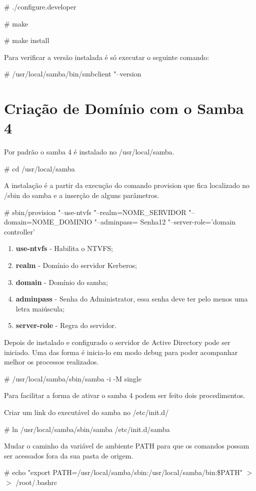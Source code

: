 \# ./configure.developer

\# make 

\# make install

Para verificar a versão instalada é só executar o seguinte comando:

\# /usr/local/samba/bin/smbclient "--version 

\section{Criação de Domínio com o Samba 4}

Por padrão o samba 4 é instalado no /usr/local/samba.

\# cd /usr/local/samba

A instalação é a partir da execução do comando provision que fica localizado no /sbin do samba e a inserção de alguns parâmetros.

\# sbin/provision "--use-ntvfs "--realm=NOME\_SERVIDOR "--domain=NOME\_DOMINIO  "--adminpass= Senha12 "--server-role='domain controller'

\begin{enumerate}
	\item \textbf{use-ntvfs} - Habilita o NTVFS;
	\item \textbf{realm} - Domínio do servidor Kerberos;
	\item \textbf{domain} - Domínio do samba;
	\item \textbf{adminpass} - Senha do Administrator, essa senha deve ter pelo menos uma letra maiúscula;
	\item \textbf{server-role} - Regra do servidor.
\end{enumerate}

Depois de instalado e configurado o servidor de Active Directory pode ser iniciado. Uma das forma é inicia-lo em modo debug para poder acompanhar melhor os processos realizados.

\# /usr/local/samba/sbin/samba -i -M single

Para facilitar a forma de ativar o samba 4 podem ser feito dois procedimentos.

Criar um link do executável do samba no /etc/init.d/

\# ln /usr/local/samba/sbin/samba /etc/init.d/samba

Mudar o caminho da variável de ambiente PATH para que os comandos possam ser acessados fora da sua pasta de origem.

\# echo "export PATH=/usr/local/samba/sbin:/usr/local/samba/bin:\$PATH"  $>$$>$ /root/.bashrc


